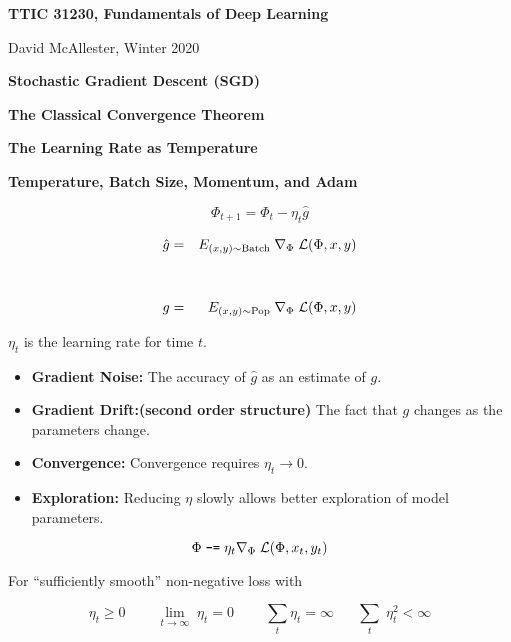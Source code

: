 


\newcommand{\solution}[1]{\bigskip {\bf Solution}: #1}



{\Huge
  \centerline{\bf TTIC 31230, Fundamentals of Deep Learning}
  \bigskip
  \centerline{David McAllester, Winter 2020}
  \vfill
  \centerline{\bf Stochastic Gradient Descent (SGD)}
  \vfill
  \vfill
  \centerline{\bf The Classical Convergence Theorem}
  \vfill
  \centerline{\bf The Learning Rate as Temperature}
  \vfill
  \centerline{\bf Temperature, Batch Size, Momentum, and Adam}


$$\Phi_{t+1} = \Phi_t - \eta_t \hat{g}$$

\vfill
\begin{eqnarray*}
  \hat{g} & = & E_{(x,y) \sim \mathrm{Batch}}\;\nabla_\Phi\;{\cal L}(\Phi,x,y) \\
  \\
  \\
  g & = & E_{(x,y) \sim \mathrm{Pop}}\;\nabla_\Phi\;{\cal L}(\Phi,x,y) \\
\end{eqnarray*}

\vfill
\centerline{$\eta_t$ is the learning rate for time $t$.}



\vfill
\begin{itemize}
\item {\bf Gradient Noise:} The accuracy of $\hat{g}$ as an estimate of $g$.

  \vfill
\item {\bf Gradient Drift:(second order structure)} The fact that $g$ changes as the parameters change.

  \vfill
\item {\bf Convergence:} Convergence requires $\eta_t \rightarrow 0$.

  \vfill
  \item {\bf Exploration:} Reducing $\eta$ slowly allows better exploration of model parameters.
\end{itemize}


$$\Phi \;\mbox{\tt -=} \; \eta_t \nabla_\Phi\;{\cal L}(\Phi,x_t,y_t)$$

\vfill
For ``sufficiently smooth'' non-negative loss with

\vfill
$$\eta_t \geq 0\;\;\;\;\;\;\;\;\lim_{t \rightarrow \infty} \;\eta_t = 0\;\;\;\;\;\;\;\;\sum_t \eta_t = \infty \;\;\;\;\;\;\sum_t \;\eta_t^2 < \infty$$

}
